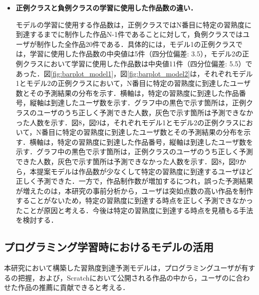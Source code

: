 \documentclass[submit]{ipsj}
\begin{document}
\begin{itemize}
\item \textbf{正例クラスと負例クラスの学習に使用した作品数の違い．}

モデルの学習に使用する作品数は，正例クラスではN番目に特定の習熟度に到達するまでに制作した作品N-1件であることに対して，負例クラスではユーザが制作した全作品20件である．具体的には，モデル1の正例クラスでは，学習に使用した作品数の中央値は5件（四分位偏差: 3.5），モデル2の正例クラスにおいて学習に使用した作品数は中央値11件（四分位偏差: 5.5）であった．図\ref{fig:barplot_model1}，図\ref{fig:barplot_model2}は，それぞれモデル1とモデル2の正例クラスにおいて，N番目に特定の習熟度に到達したユーザ数とその予測結果の分布を示す．横軸は，特定の習熟度に到達した作品番号，縦軸は到達したユーザ数を示す．グラフ中の黒色で示す箇所は，正例クラスのユーザのうち正しく予測できた人数，灰色で示す箇所は予測できなかった人数を示す．図8，図9は，それぞれモデル1とモデル2の正例クラスにおいて，N番目に特定の習熟度に到達したユーザ数とその予測結果の分布を示す．横軸は，特定の習熟度に到達した作品番号，縦軸は到達したユーザ数を示す．グラフ中の黒色で示す箇所は，正例クラスのユーザのうち正しく予測できた人数，灰色で示す箇所は予測できなかった人数を示す．図8，図9から，本提案モデルは作品数が少なくして特定の習熟度に到達するユーザほど正しく予測できた．一方で，作品制作数が増加するにつれ，誤った予測結果が増えたのは，本研究の事前分析から，ユーザは突如点数の高い作品を制作することがないため，特定の習熟度に到達する時点を正しく予測できなかったことが原因と考える．今後は特定の習熟度に到達する時点を見積もる手法を検討する．

\end{itemize}

\subsection{プログラミング学習時におけるモデルの活用}
本研究において構築した習熟度到達予測モデルは，プログラミングユーザが有する\textcolor{red}{}の把握，および，Scratchにおいて公開される作品の中から，ユーザの\textcolor{red}{}に合わせた作品の推薦に貢献できると考える．
\end{document}
